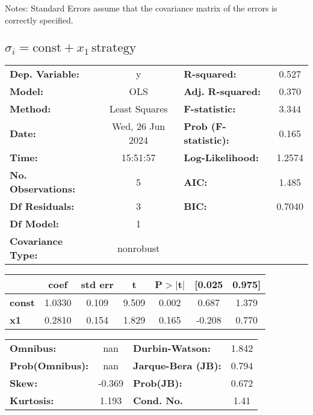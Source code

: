 \documentclass{article}
\begin{document}
Notes: \newline
[1] Standard Errors assume that the covariance matrix of the errors is correctly specified.

\subsection{$\sigma_i = \text{const} + x_1\,\text{strategy}$}

\begin{center}
    \begin{tabular}{lclc}
        \toprule
        \textbf{Dep. Variable:}    & y                & \textbf{  R-squared:         } & 0.527  \\
        \textbf{Model:}            & OLS              & \textbf{  Adj. R-squared:    } & 0.370  \\
        \textbf{Method:}           & Least Squares    & \textbf{  F-statistic:       } & 3.344  \\
        \textbf{Date:}             & Wed, 26 Jun 2024 & \textbf{  Prob (F-statistic):} & 0.165  \\
        \textbf{Time:}             & 15:51:57         & \textbf{  Log-Likelihood:    } & 1.2574 \\
        \textbf{No. Observations:} & 5                & \textbf{  AIC:               } & 1.485  \\
        \textbf{Df Residuals:}     & 3                & \textbf{  BIC:               } & 0.7040 \\
        \textbf{Df Model:}         & 1                & \textbf{                     } &        \\
        \textbf{Covariance Type:}  & nonrobust        & \textbf{                     } &        \\
        \bottomrule
    \end{tabular}
    \begin{tabular}{lcccccc}
                       & \textbf{coef} & \textbf{std err} & \textbf{t} & \textbf{P$> |$t$|$} & \textbf{[0.025} & \textbf{0.975]} \\
        \midrule
        \textbf{const} & 1.0330        & 0.109            & 9.509      & 0.002               & 0.687           & 1.379           \\
        \textbf{x1}    & 0.2810        & 0.154            & 1.829      & 0.165               & -0.208          & 0.770           \\
        \bottomrule
    \end{tabular}
    \begin{tabular}{lclc}
        \textbf{Omnibus:}       & nan    & \textbf{  Durbin-Watson:     } & 1.842 \\
        \textbf{Prob(Omnibus):} & nan    & \textbf{  Jarque-Bera (JB):  } & 0.794 \\
        \textbf{Skew:}          & -0.369 & \textbf{  Prob(JB):          } & 0.672 \\
        \textbf{Kurtosis:}      & 1.193  & \textbf{  Cond. No.          } & 1.41  \\
        \bottomrule
    \end{tabular}
\end{center}
\end{document}
